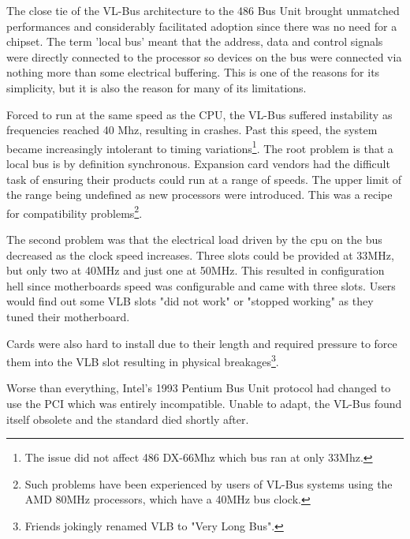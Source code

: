 \par
The close tie of the VL-Bus architecture to the 486 Bus Unit brought unmatched performances and considerably facilitated adoption since there was no need for a chipset. The term 'local bus' meant that the address, data and control signals were directly connected to the processor so devices on the bus were connected via nothing more than some electrical buffering. This is one of the reasons for its simplicity, but it is also the reason for many of its limitations.\\
\par
Forced to run at the same speed as the CPU, the VL-Bus suffered instability as frequencies reached 40 Mhz, resulting in crashes. Past this speed, the system became increasingly intolerant to timing variations\footnote{The issue did not affect 486 DX-66Mhz which bus ran at only 33Mhz.}. The root problem is that a local bus is by definition synchronous. Expansion card vendors had the difficult task of ensuring their products could run at a range of speeds. The upper limit of the range being undefined as new processors were introduced. This was a recipe for compatibility problems\footnote{Such problems have been experienced by users of VL-Bus systems using the AMD 80MHz processors, which have a 40MHz bus clock.}.\\
\par
The second problem was that the electrical load driven by the cpu on the bus decreased as the clock speed increases. Three slots could be provided at 33MHz, but only two at 40MHz and just one at 50MHz. This resulted in configuration hell since motherboards speed was configurable and came with three slots. Users would find out some VLB slots "did not work" or "stopped working" as they tuned their motherboard.\\
\par
Cards were also hard to install due to their length and required pressure to force them into the VLB slot resulting in physical breakages\footnote{Friends jokingly renamed VLB to "Very Long Bus".}.\\
\par
  Worse than everything, Intel's 1993 Pentium Bus Unit protocol had changed to use the PCI which was entirely incompatible. Unable to adapt, the VL-Bus found itself obsolete and the standard died shortly after.\\
\par

